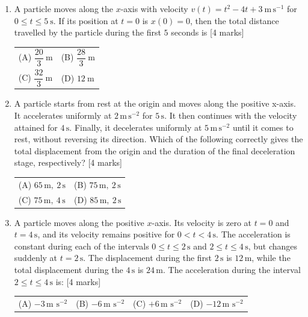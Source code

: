 \documentclass[11pt,a4paper]{article}
\begin{document}
\begin{enumerate}[resume]
\item A particle moves along the $x$-axis with velocity $v(t)=t^2-4t+3\ \mathrm{m\,s^{-1}}$ for $0\le t\le 5\ \mathrm{s}$. If its position at $t=0$ is $x(0)=0$, then the total distance travelled by the particle during the first $5$ seconds is \hfill [4 marks]
{\renewcommand{\arraystretch}{1.8}
\begin{tabularx}{\linewidth}{X X}
(A) \quad $\dfrac{20}{3}\ \mathrm{m}$ & (B) \quad $\dfrac{28}{3}\ \mathrm{m}$ \\[10pt]
(C) \quad $\dfrac{32}{3}\ \mathrm{m}$ & (D) \quad $12\ \mathrm{m}$ \\[10pt]
\end{tabularx}}
\item A particle starts from rest at the origin and moves along the positive x-axis. It accelerates uniformly at $2\,\mathrm{m\,s^{-2}}$ for $5\,\mathrm{s}$. It then continues with the velocity attained for $4\,\mathrm{s}$. Finally, it decelerates uniformly at $5\,\mathrm{m\,s^{-2}}$ until it comes to rest, without reversing its direction. Which of the following correctly gives the total displacement from the origin and the duration of the final deceleration stage, respectively? \hfill [4 marks]
{\renewcommand{\arraystretch}{1.8}
\begin{tabularx}{\linewidth}{X X}
(A) \quad $65\,\mathrm{m},\ 2\,\mathrm{s}$ & (B) \quad $75\,\mathrm{m},\ 2\,\mathrm{s}$ \\[10pt]
(C) \quad $75\,\mathrm{m},\ 4\,\mathrm{s}$ & (D) \quad $85\,\mathrm{m},\ 2\,\mathrm{s}$ \\[10pt]
\end{tabularx}}
\item A particle moves along the positive $x$-axis. Its velocity is zero at $t=0$ and $t=4\,\text{s}$, and its velocity remains positive for $0<t<4\,\text{s}$. The acceleration is constant during each of the intervals $0\le t\le2\,\text{s}$ and $2\le t\le4\,\text{s}$, but changes suddenly at $t=2\,\text{s}$. The displacement during the first $2\,\text{s}$ is $12\,\text{m}$, while the total displacement during the $4\,\text{s}$ is $24\,\text{m}$. The acceleration during the interval $2\le t\le4\,\text{s}$ is: \hfill [4 marks]
{\renewcommand{\arraystretch}{1.8}
\begin{tabularx}{\linewidth}{X X X X}
(A) \quad $-3\,\text{m s}^{-2}$ & (B) \quad $-6\,\text{m s}^{-2}$ & (C) \quad $+6\,\text{m s}^{-2}$ & (D) \quad $-12\,\text{m s}^{-2}$ \\[10pt]
\end{tabularx}}

\end{enumerate}
\end{document}
